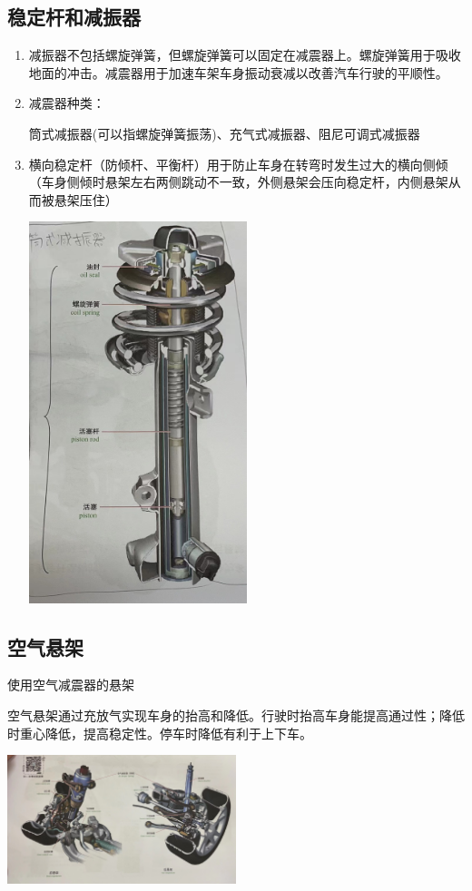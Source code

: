 		\subsection{稳定杆和减振器}
			\begin{enumerate}[label*=\arabic*)]
				\item 减振器不包括螺旋弹簧，但螺旋弹簧可以固定在减震器上。螺旋弹簧用于吸收地面的冲击。减震器用于加速车架车身振动衰减以改善汽车行驶的平顺性。
				\item 减震器种类：
					
					筒式减振器(可以指螺旋弹簧振荡)、充气式减振器、阻尼可调式减振器
				\item 横向稳定杆（防倾杆、平衡杆）用于防止车身在转弯时发生过大的横向侧倾（车身侧倾时悬架左右两侧跳动不一致，外侧悬架会压向稳定杆，内侧悬架从而被悬架压住）
				\begin{center}
					\includegraphics[width=0.5\textwidth]{3-26}
				\end{center}
			\end{enumerate}
		\subsection{空气悬架}
			使用空气减震器的悬架
			
			空气悬架通过充放气实现车身的抬高和降低。行驶时抬高车身能提高通过性；降低时重心降低，提高稳定性。停车时降低有利于上下车。
			
			\begin{center}
				\includegraphics[width=0.5\textwidth]{3-27}
			\end{center}
		
